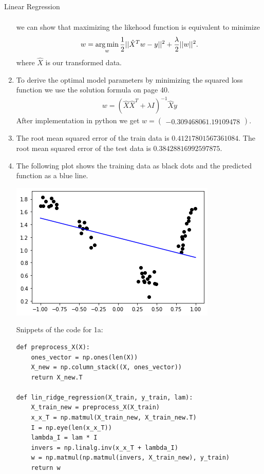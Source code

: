 \begin{task}{Linear Regression}
\begin{subtask}
\begin{enumerate}
\begin{align*}
\end{align*}
we can show that maximizing the likehood function is equivalent to minimize
\begin{align*}
w = \operatorname*{arg\,min}_{w} \frac{1}{2} ||\hat{X}^Tw - y||^2 + \frac{\lambda}{2} ||w||^2.
\end{align*}
where $\hat{X}$ is our transformed data.
\item To derive the optimal model parameters by minimizing the squared loss function we use the solution formula on page 40.
\begin{align*}
w = (\hat{X} \hat{X}^T + \lambda I)^{-1} \hat{X} y 
\end{align*}
After implementation in python we get $w = \begin{pmatrix} -0.30946806  1.19109478 \end{pmatrix}$.
\item The root mean squared error of the train data is $0.41217801567361084$. The root mean squared error of the test data is $0.38428816992597875$.
\item The following plot shows the training data as black dots and the predicted function as a blue line. \\
\begin{center}
\includegraphics{Figure_1a.png}
\end{center}
Snippets of the code for 1a:
\begin{lstlisting}
def preprocess_X(X):
    ones_vector = np.ones(len(X))
    X_new = np.column_stack((X, ones_vector))
    return X_new.T

def lin_ridge_regression(X_train, y_train, lam):
    X_train_new = preprocess_X(X_train)
    x_x_T = np.matmul(X_train_new, X_train_new.T)
    I = np.eye(len(x_x_T))
    lambda_I = lam * I
    invers = np.linalg.inv(x_x_T + lambda_I)
    w = np.matmul(np.matmul(invers, X_train_new), y_train)
    return w


\end{lstlisting}
\end{enumerate}
\end{subtask}
\end{task}
